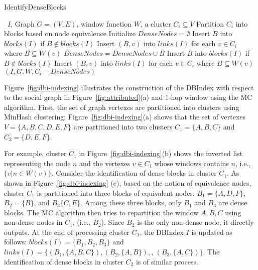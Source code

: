 \begin{algorithm}
\caption{IdentifyDenseBlocks}
\begin{algorithmic}[1] \small
\Require \DBIndex\ $I$, Graph $G=(V,E)$, window function $W$, a cluster $C_i \subseteq V$
\State Partition $C_i$ into blocks based on node equivalence
\State Initialize $DenseNodes = \emptyset$
	\State Insert $B$ into $blocks(I)$ if $B \not\in blocks(I)$
	\State Insert $(B,v)$ into $links(I)$ for each $v \in C_i$ where $B \subseteq W(v)$
	\State $DenseNodes = DenseNodes \cup B$
\EndFor
{}
		\State Insert $B$ into $blocks(I)$ if $B \not\in blocks(I)$
		\State Insert $(B,v)$ into $links(I)$ for each $v \in C_i$ where $B \subseteq W(v)$
	\EndFor
{}
		 $(I,G,W,C_i - DenseNodes)$
	\EndIf
\EndIf
\end{algorithmic}
\label{algo:identify}
\end{algorithm}

Figure~\ref{fig:dbi-indexing} 
illustrates the construction of the DBIndex with respect to the social graph in 
Figure~\ref{fig:attributed}(a) and 1-hop window using the MC algorithm.
First, the set of graph vertexes are partitioned into clusters using MinHash clustering;
Figure~\ref{fig:dbi-indexing}(a)
shows that the set of vertexes $V = \{A, B, C, D, E, F \}$ are partitioned into two clusters $C_1=\{A, B, C\}$ and $C_2=\{D, E, F\}$. 

For example, cluster $C_1$ in 
Figure~\ref{fig:dbi-indexing}(b) shows the inverted list representing
the node $n$ and the vertexes $v \in C_1$ whose windows contains $n$, i.e., $\{v | n \in W(v) \}$.
%
Consider the identification of dense blocks in cluster $C_1$.
As shown in Figure~\ref{fig:dbi-indexing} (c), based on the notion of equivalence nodes,
cluster $C_1$ is partitioned into three blocks of equivalent nodes:
$B_1=\{A,D,F\}$, $B_2=\{B\}$, and $B_3\{C,E\}$.
Among these three blocks, only
$B_1$ and $B_3$ are dense blocks.
The MC algorithm then tries to repartition the window $A,B,C$ using non-dense nodes in $C_1$,
(i.e., $B_2$). Since $B_2$ is the only non-dense node, it directly outputs.
At the end of processing cluster $C_1$,
the DBIndex $I$ is updated as follows:
$blocks(I) = \{B_1, B_2, B_3\}$ 
and
$links(I) = \{ (B_1,\{A,B,C\}), (B_2, \{A,B\}),$, $(B_3, \{A,C\}) \}$. 
The identification of dense blocks in cluster $C_2$ 
is of similar process.

